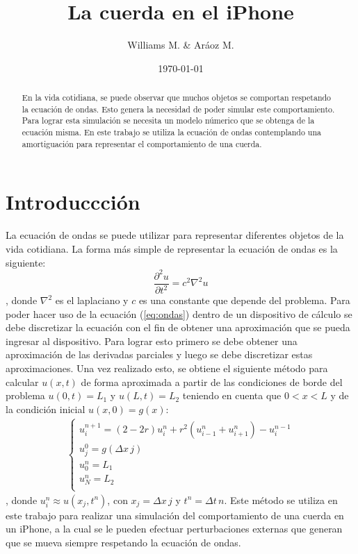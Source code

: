 \documentclass[11pt,a4paper]{emulateapj}
\begin{document}
\title{La cuerda en el iPhone}
\author{Williams M. \& Aráoz M.}
\date{\today}


\begin{abstract}
En la vida cotidiana, se puede observar que muchos objetos se comportan respetando la ecuación de ondas. Esto genera la necesidad de poder simular este comportamiento. Para lograr esta simulación se necesita un modelo númerico que se obtenga de la ecuación misma. En este trabajo se utiliza la ecuación de ondas contemplando una amortiguación para representar el comportamiento de una cuerda. 
\end{abstract}

\maketitle




\section{Introduccción}
\label{sec:introduccion}
La ecuación de ondas se puede utilizar para representar diferentes objetos de la vida cotidiana. La forma más simple de representar la ecuación de ondas es la siguiente:
\begin{equation}
\label{eq:ondas}
\frac{\partial ^2 u}{\partial t^2} = c^2 \nabla ^2 u
\end{equation}
, donde $\nabla ^2$ es el laplaciano y $c$ es una constante que depende del problema. Para poder hacer uso de la ecuación (\ref{eq:ondas}) dentro de un dispositivo de cálculo se debe discretizar la ecuación con el fin de obtener una aproximación que se pueda ingresar al dispositivo. Para lograr esto primero se debe obtener una aproximación de las derivadas parciales y luego se debe discretizar estas aproximaciones. Una vez realizado esto, se obtiene el siguiente método para calcular $u(x,t)$ de forma aproximada a partir de las condiciones de borde del problema $u(0,t) = L_1$ y $u(L,t) = L_2$ teniendo en cuenta que $0 < x < L$ y de la condición inicial $u(x,0) = g(x)$:
\begin{eqnarray}
	\label{eq:metodoDeOndas}
	\left\{
		\begin{matrix}
			u_i^{n+1} = (2-2r) u_i^n + r^2 (u_{i-1}^n+u_{i+1}^n) - u_i^{n-1}\\
			u_j^0 = g(\Delta x\, j)\\
			u_0^n = L_1\\ 
			u_N^n = L_2\\
		\end{matrix} \right.
\end{eqnarray}
, donde $u_i^{n} \approx u(x_j,t^n)$, con $x_j = \Delta x\, j$ y $t^n = \Delta t\, n$.
Este método se utiliza en este trabajo para realizar una simulación del comportamiento de una cuerda en un iPhone, a la cual se le pueden efectuar perturbaciones externas que generan que se mueva siempre respetando la ecuación de ondas.
\end{document}
